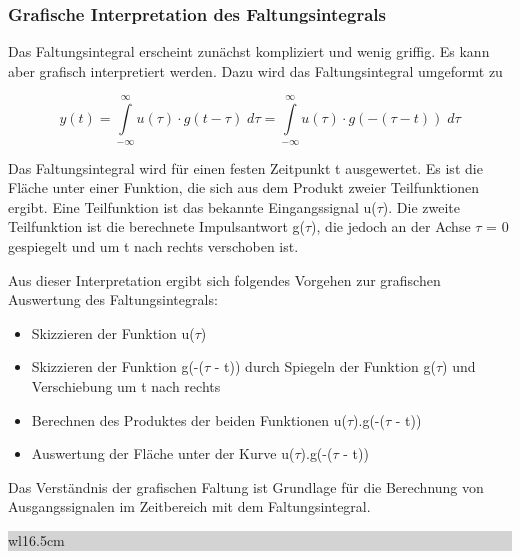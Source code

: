 \subsubsection{Grafische Interpretation des Faltungsintegrals}

\noindent Das Faltungsintegral erscheint zunächst kompliziert und wenig griffig. Es kann aber grafisch interpretiert werden. Dazu wird das Faltungsintegral umgeformt zu

\begin{equation}\label{eq:threehundredfiftyeight}
y\left(t\right)=\int\limits _{-\infty }^{\infty }u\left(\tau \right)\cdot g\left(t-\tau \right)\;d\tau  =\int\limits _{-\infty }^{\infty }u\left(\tau \right)\cdot g\left(-\left(\tau -t\right)\right)\;d\tau 
\end{equation}

\noindent Das Faltungsintegral wird für einen festen Zeitpunkt t ausgewertet. Es ist die Fläche unter einer Funktion, die sich aus dem Produkt zweier Teilfunktionen ergibt. Eine Teilfunktion ist das bekannte Eingangssignal u($\tau$). Die zweite Teilfunktion ist die berechnete Impulsantwort g($\tau$), die jedoch an der Achse $\tau$ = 0 gespiegelt und um t nach rechts verschoben ist. \medskip

\noindent Aus dieser Interpretation ergibt sich folgendes Vorgehen zur grafischen Auswertung des Faltungsintegrals:

\begin{itemize}
\item  Skizzieren der Funktion u($\tau$)

\item  Skizzieren der Funktion g(-($\tau$ - t)) durch Spiegeln der Funktion g($\tau$) und Verschiebung um t nach rechts

\item  Berechnen des Produktes der beiden Funktionen u($\tau$)$.$g(-($\tau$ - t))

\item  Auswertung der Fl\"{a}che unter der Kurve u($\tau$)$.$g(-($\tau$ - t))
\end{itemize}

\noindent Das Verständnis der grafischen Faltung ist Grundlage für die Berechnung von Ausgangssignalen im Zeitbereich mit dem Faltungsintegral.\bigskip

\noindent
\colorbox{lightgray}{%
%
\renewcommand\arraystretch{0.6}%
\begin{tabular}{ wl{16.5cm} }
{\selectfont{
Beispiel: Grafische Faltung zweier Rechteckfunktionen}}
\end{tabular}%
}\bigskip

